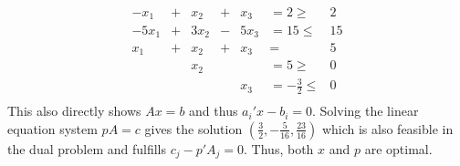 \documentclass{article}
\begin{document}
\begin{solving}
\begin{enumerate}
\begin{equation*}
\begin{array}{rcrcrcr}
              -x_1 & + & x_2 &+ & x_3 & = 2 \geq &2\\
              -5x_1 & + & 3x_2 &- & 5x_3 & = 15\leq &15\\
               x_1 & + & x_2 &+ & x_3 & = &5\\
               &  & x_2 & & & = 5 \geq &0\\
              &  &  & & x_3 & = -\frac32\leq &0\\
        \end{array}
        \end{equation*}
        This also directly shows $Ax= b$ and thus $a_i'x-b_i = 0$. Solving the linear equation system $pA = c$ gives the solution $(\frac 32, -\frac5{16}, \frac{23}{16})$ which is also feasible in the dual problem and fulfills $c_j-p'A_j = 0$. Thus, both $x$ and $p$ are optimal.
    \end{enumerate}
\end{solving}
\end{document}
